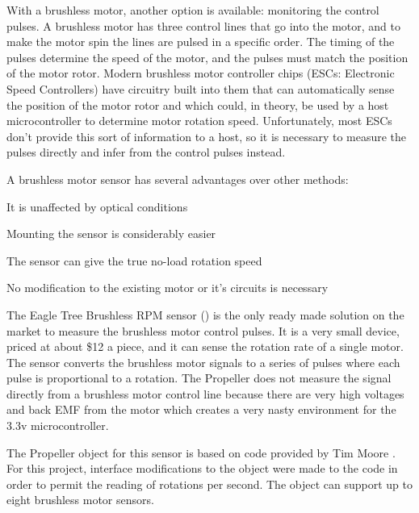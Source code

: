 \documentclass{article}
\numberwithin{equation}{section} %
\begin{document}
With a brushless motor, another option is available: monitoring the control pulses. A brushless motor has three control lines that go into the motor, and to make the motor spin the lines are pulsed in a specific order. The  timing of the pulses determine the speed of the motor, and the pulses must match the position of the motor rotor. Modern brushless motor controller chips (ESCs: Electronic Speed Controllers) have circuitry built into them that can automatically sense the position of the motor rotor and which could, in theory, be used by a host microcontroller to determine motor rotation speed. Unfortunately, most ESCs don't provide this sort of information to a host, so it is necessary to measure the pulses directly and infer from the control pulses instead. 

A brushless motor sensor has several advantages over other methods:
\begin{list}{*}{}
	\item It is unaffected by optical conditions
	\item Mounting the sensor is considerably easier
	\item The sensor can give the true no-load rotation speed
	\item No modification to the existing motor or it's circuits is necessary
\end{list}

The Eagle Tree Brushless RPM sensor (\cite{eaglerpm}) is the only ready made solution on the market to measure the brushless motor control pulses. It is a very small device, priced at about \$12 a piece, and it can sense the rotation rate of a single motor. The sensor converts the brushless motor signals to a series of pulses where each pulse is proportional to a rotation. The Propeller does not measure the signal directly from a brushless motor control line because there are very high voltages and back EMF from the motor which creates a very nasty environment for the 3.3v microcontroller.

The Propeller object for this sensor is based on code provided by Tim Moore \cite{eaglerpmobject} . For this project, interface modifications to the object were made to the code in order to permit the reading of rotations per second. The object can support up to eight brushless motor sensors. 
\end{document}

